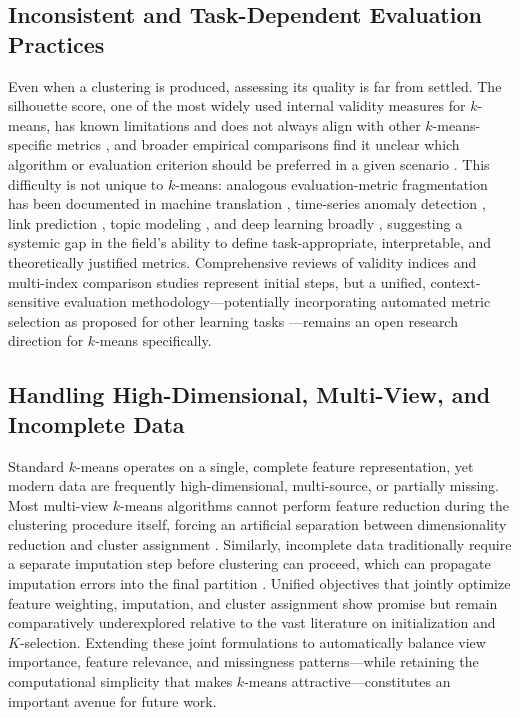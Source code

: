 \subsection{Inconsistent and Task-Dependent Evaluation Practices}
Even when a clustering is produced, assessing its quality is far from settled. The silhouette score, one of the most widely used internal validity measures for $k$-means, has known limitations and does not always align with other $k$-means-specific metrics \cite{myagmarsuren2024exploring}, and broader empirical comparisons find it unclear which algorithm or evaluation criterion should be preferred in a given scenario \cite{harris2022extensive}. This difficulty is not unique to $k$-means: analogous evaluation-metric fragmentation has been documented in machine translation \cite{lee2023survey}, time-series anomaly detection \cite{srb2023navigating}, link prediction \cite{bi2024inconsistency}, topic modeling \cite{rudiger2022topic}, and deep learning broadly \cite{terven2025comprehensive}, suggesting a systemic gap in the field's ability to define task-appropriate, interpretable, and theoretically justified metrics. Comprehensive reviews of validity indices \cite{ikotun2025cluster} and multi-index comparison studies \cite{ashari2023analysis} represent initial steps, but a unified, context-sensitive evaluation methodology---potentially incorporating automated metric selection as proposed for other learning tasks \cite{terven2025comprehensive}---remains an open research direction for $k$-means specifically.

\subsection{Handling High-Dimensional, Multi-View, and Incomplete Data}
Standard $k$-means operates on a single, complete feature representation, yet modern data are frequently high-dimensional, multi-source, or partially missing. Most multi-view $k$-means algorithms cannot perform feature reduction during the clustering procedure itself, forcing an artificial separation between dimensionality reduction and cluster assignment \cite{yang2019feature}. Similarly, incomplete data traditionally require a separate imputation step before clustering can proceed, which can propagate imputation errors into the final partition \cite{wang2019means}. Unified objectives that jointly optimize feature weighting, imputation, and cluster assignment \cite{yang2019feature,wang2019means} show promise but remain comparatively underexplored relative to the vast literature on initialization and $K$-selection. Extending these joint formulations to automatically balance view importance, feature relevance, and missingness patterns---while retaining the computational simplicity that makes $k$-means attractive---constitutes an important avenue for future work.

